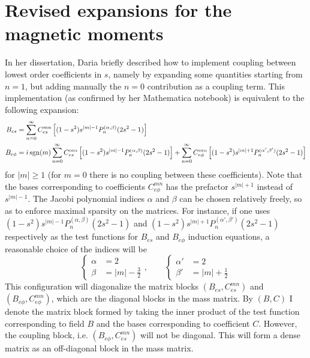 \section{Revised expansions for the magnetic moments}


In her dissertation, Daria briefly described how to implement coupling between lowest order coefficients in $s$, namely by expanding some quantities starting from $n=1$, but adding manually the $n=0$ contribution as a coupling term. This implementation (as confirmed by her Mathematica notebook) is equivalent to the following expansion:
\begin{equation}
\begin{aligned}
    B_{es} &= \sum_{n=0}^\infty C_{es}^{mn} \left[(1-s^2) s^{|m|-1} P_n^{(\alpha, \beta)}(2s^2 - 1)\right] \\ 
    B_{e\phi} &= i\operatorname{sgn}(m)\sum_{n=0}^\infty C_{es}^{mn} \left[(1-s^2) s^{|m|-1} P_n^{(\alpha, \beta)}(2s^2 - 1)\right] + \sum_{n=0}^\infty C_{e\phi}^{mn} \left[(1-s^2) s^{|m|+1} P_n^{(\alpha', \beta')}(2s^2 - 1)\right]
\end{aligned}
\end{equation}
for $|m|\geq 1$ (for $m=0$ there is no coupling between these coefficients). 
Note that the bases corresponding to coefficients $C_{e\phi}^{mn}$ has the prefactor $s^{|m|+1}$ instead of $s^{|m|-1}$. 
The Jacobi polynomial indices $\alpha$ and $\beta$ can be chosen relatively freely, so as to enforce maximal sparsity on the matrices. 
For instance, if one uses $(1 - s^2) s^{|m|-1}P_n^{(\alpha, \beta)}(2s^2 - 1)$ and $(1 - s^2) s^{|m|+1}P_n^{(\alpha', \beta')}(2s^2 - 1)$ respectively as the test functions for $B_{es}$ and $B_{e\phi}$ induction equations, a reasonable choice of the indices will be
\[
    \left\{\begin{aligned}
        \alpha &= 2 \\ 
        \beta &= |m| - \frac{3}{2}
    \end{aligned}\right.,\qquad 
    \left\{\begin{aligned}
        \alpha' &= 2 \\
        \beta' &= |m| + \frac{1}{2}
    \end{aligned}\right.
\]
This configuration will diagonalize the matrix blocks $(B_{es}, C_{es}^{mn})$ and $(B_{e\phi}, C_{e\phi}^{mn})$, which are the diagonal blocks in the mass matrix. By $(B, C)$ I denote the matrix block formed by taking the inner product of the test function corresponding to field $B$ and the bases corresponding to coefficient $C$. 
However, the coupling block, i.e. $(B_{e\phi}, C_{es}^{mn})$ will not be diagonal. This will form a dense matrix as an off-diagonal block in the mass matrix.

